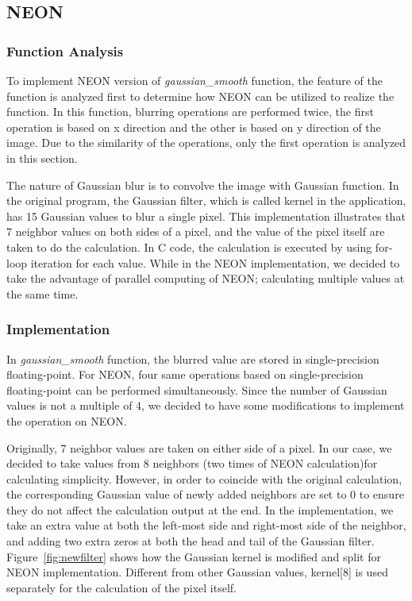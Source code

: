 \subsection{NEON}
\subsubsection{Function Analysis}

To implement NEON version of \textit{gaussian\_smooth} function, the feature of the function is analyzed first to determine how NEON can be utilized to
realize the function. In this function, blurring operations are performed twice, the first operation is based on x direction and the other is based on y direction of the image. Due to the similarity of the operations, only the first operation is analyzed in this section. 

The nature of Gaussian blur is to convolve the image with Gaussian function. In the original program, the Gaussian filter, which is called kernel in the application, has 15 Gaussian values to blur a single pixel. This implementation illustrates that 7 neighbor values on both sides of a pixel, and the value of the pixel itself are taken to do the calculation. In C code, the calculation is executed by using for-loop iteration for each value. While in the NEON implementation, we decided to take the advantage of parallel computing of NEON; calculating multiple values at the same time.

\subsubsection{Implementation}

In \textit{gaussian\_smooth} function, the blurred value are stored in single-precision floating-point. For NEON, four same operations based on single-precision floating-point can be performed simultaneously. Since the number of Gaussian values is not a multiple of 4, we decided to have some modifications to implement the operation on NEON. 

Originally, 7 neighbor values are taken on either side of a pixel. In our case, we decided to take values from 8 neighbors (two times of NEON calculation)for calculating simplicity. However, in order to coincide with the original calculation, the corresponding Gaussian value of newly added neighbors are set to 0 to ensure they do not affect the calculation output at the end. In the implementation, we take an extra value at both the left-most side and right-most side of the neighbor, and adding two extra zeros at both the head and tail of the Gaussian filter. Figure~\ref{fig:newfilter} shows how the Gaussian kernel is modified and split for NEON implementation. Different from other Gaussian values, kernel[8] is used separately for the calculation of the pixel itself. 


